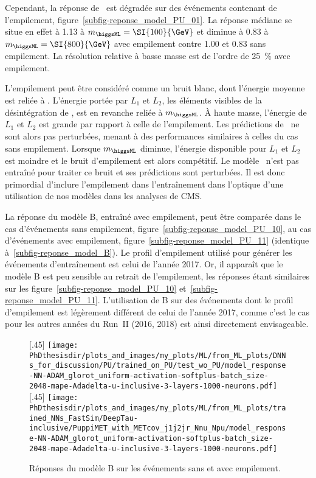 \par
Cependant, la réponse de \Bnpu\ est dégradée sur des événements contenant de l'empilement, figure~\ref{subfig-reponse_model_PU_01}.
La réponse médiane se situe en effet à \num{1.13} à $m_{\higgsML}=\SI{100}{\GeV}$ et diminue à \num{0.83} à $m_{\higgsML}=\SI{800}{\GeV}$ avec empilement contre \num{1.00} et \num{0.83} sans empilement.
La résolution relative à basse masse est de l'ordre de \SI{25}{\%} avec empilement.
\par
L'empilement peut être considéré comme un bruit blanc, dont l'énergie moyenne est reliée à \Npu.
L'énergie portée par $L_1$ et $L_2$, les éléments visibles de la désintégration de \higgsML,
est en revanche reliée à $m_{\higgsML}$.
À haute masse, l'énergie de $L_1$ et $L_2$ est grande par rapport à celle de l'empilement.
Les prédictions de \Bnpu\ ne sont alors pas perturbées,
menant à des performances similaires à celles du cas sans empilement.
Lorsque $m_{\higgsML}$ diminue,
l'énergie disponible pour $L_1$ et $L_2$ est moindre
et
le bruit d'empilement est alors compétitif.
Le modèle \Bnpu\ n'est pas entraîné pour traiter ce bruit et ses prédictions sont perturbées.
Il est donc primordial d'inclure l'empilement dans l'entraînement dans l'optique d'une utilisation de nos modèles dans les analyses de CMS.
\par
La réponse du modèle B, entraîné avec empilement, peut être comparée
dans le cas d'événements sans empilement, figure~\ref{subfig-reponse_model_PU_10},
au cas d'événements avec empilement, figure~\ref{subfig-reponse_model_PU_11} (identique à~\ref{subfig-reponse_model_B}).
Le profil d'empilement utilisé pour générer les événements d'entraînement est celui de l'année 2017.
Or, il apparaît que le modèle B est peu sensible au retrait de l'empilement, les réponses étant similaires sur les figure~\ref{subfig-reponse_model_PU_10} et~\ref{subfig-reponse_model_PU_11}.
L'utilisation de B sur des événements dont le profil d'empilement est légèrement différent de celui de l'année 2017,
comme c'est le cas pour les autres années du Run~II (2016, 2018)
est ainsi directement envisageable.
\begin{figure}[h]
\centering

[.45\textwidth]
{\texttt{[image: \\PhDthesisdir/plots\_and\_images/my\_plots/ML/from\_ML\_plots/DNNs\_for\_discussion/PU/trained\_on\_PU/test\_wo\_PU/model\_response-NN-ADAM\_glorot\_uniform-activation-softplus-batch\_size-2048-mape-Adadelta-u-inclusive-3-layers-1000-neurons.pdf]}\vspace{-.5\baselineskip}}
\hfill
{}[.45\textwidth]
{\texttt{[image: \\PhDthesisdir/plots\_and\_images/my\_plots/ML/from\_ML\_plots/trained\_NNs\_FastSim/DeepTau-inclusive/PuppiMET\_with\_METcov\_j1j2jr\_Nnu\_Npu/model\_response-NN-ADAM\_glorot\_uniform-activation-softplus-batch\_size-2048-mape-Adadelta-u-inclusive-3-layers-1000-neurons.pdf]}\vspace{-.5\baselineskip}}

\caption{Réponses du modèle B sur les événements sans et avec empilement.}
\label{fig-reponse_model_1PU}
\end{figure}

